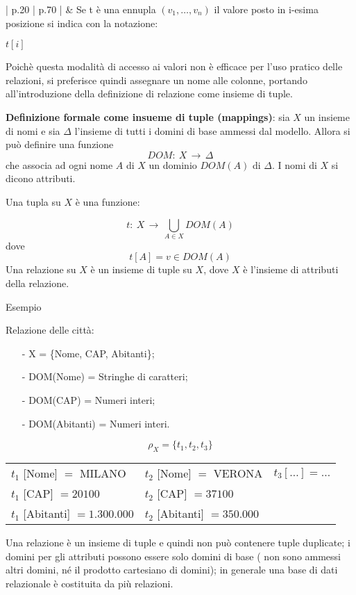 \documentclass[a4paper, 10pt]{report}
\begin{document}
\begin{longtable}{| p{} | p{} |}
 & Se t è una ennupla $(v_1 , \dots, v_n )$ il valore posto in i-esima posizione si indica con la notazione:
\begin{center}
$t[i]$
\end{center}

Poichè questa modalità di accesso ai valori non è efficace per l'uso
			pratico delle relazioni, si preferisce quindi assegnare un nome
			alle colonne, portando all'introduzione della definizione di
			relazione come insieme di tuple.

\medskip
\medskip

\textbf{Definizione formale come insueme di tuple (mappings)}: sia $X$ un insieme di nomi e sia $\Delta$ l'insieme di tutti i domini di
			base ammessi dal modello. Allora si può definire una funzione
			\[
				DOM: \: X \, \rightarrow \, \Delta
			\]
			che associa ad ogni nome $A$ di $X$ un dominio $DOM(A)$ di $\Delta$. 
			I nomi di $X$ si dicono attributi.
			
			Una tupla su $X$ è una funzione:
		
			\[
				t : \: X \, \rightarrow \, \bigcup_{A \in X} DOM (A) 
			\]
			dove
			\[
				t [ A ] = v \in DOM (A)
			\]
			Una relazione su $X$ è un insieme di tuple su $X$, dove $X$ è
			l'insieme di attributi della relazione.

\medskip

Esempio

\medskip
		Relazione delle città:
		\begin{center}
		\begin{itemize}
			\item[-] X = \{Nome, CAP, Abitanti\};
			\item[-] DOM(Nome) = Stringhe di caratteri;
			\item[-] DOM(CAP) = Numeri interi;
			\item[-] DOM(Abitanti) = Numeri interi.
		\end{itemize}
		\end{center}
		\[
			\rho_X = \{ t_1 , t_2 , t_3 \}
		\]
		\begin{tabular}{lll}
			$t_1$ [Nome] $=$ MILANO & $t_2$ [Nome] $=$ VERONA & $t_3 [\dots] = \dots$ \\
			$t_1$ [CAP] $= 20100$ & $t_2$ [CAP] $= 37100$ & \\
			$t_1$ [Abitanti] $= 1.300.000$ & $t_2$ [Abitanti] $= 350.000$ & 
		\end{tabular}

\medskip

Una relazione è un insieme di tuple e quindi non può contenere tuple duplicate; i domini per gli attributi possono essere solo domini di base (
			non sono ammessi altri domini, né il prodotto cartesiano di
			domini); in generale una base di dati relazionale è costituita da più
			relazioni.

\end{longtable}
\end{document}
